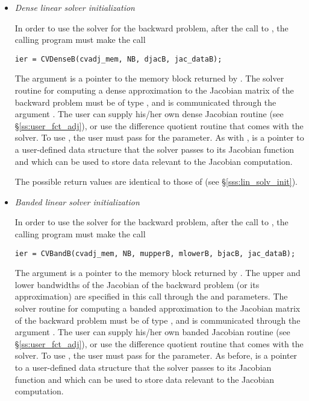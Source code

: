 \begin{itemize}

\item {\em Dense linear solver initialization}

  In order to use the {\cvdense} solver for the backward problem, after the call to 
  , the calling program must make the call
\begin{verbatim}
ier = CVDenseB(cvadj_mem, NB, djacB, jac_dataB);
\end{verbatim}
  The argument  is a pointer to the memory block
  returned by . The {\cvdense} solver routine for computing a
  dense approximation to the Jacobian matrix of the backward problem must be
  of type , and is communicated through the argument
  . The user can supply his/her own dense Jacobian routine
  (see \S\ref{ss:user_fct_adj}), or use the difference quotient routine 
   that comes with the {\cvdense} solver.  To use 
  , the user must pass  for the  parameter.
  As with ,  is a pointer to a user-defined 
  data structure that the {\cvdense} solver passes to its Jacobian function
  and which can be used to store data relevant to the Jacobian computation.
  
  The possible return values  are identical to those of 
  (see \S\ref{sss:lin_solv_init}).

\item {\em Banded linear solver initialization}

  In order to use the {\cvband} solver for the backward problem, after the call to 
  , the calling program must make the call
\begin{verbatim}
ier = CVBandB(cvadj_mem, NB, mupperB, mlowerB, bjacB, jac_dataB);
\end{verbatim}  
  The  argument  is a pointer to the memory block
  returned by . The upper and lower bandwidths of the 
  Jacobian of the backward problem (or its approximation) are specified 
  in this call through the  and  parameters.
  The {\cvband} solver routine for computing a
  banded approximation to the Jacobian matrix of the backward problem must be
  of type , and is communicated through the argument
  . The user can supply his/her own banded Jacobian routine
  (see \S\ref{ss:user_fct_adj}), or use the difference quotient routine 
   that comes with the {\cvband} solver.  To use 
  , the user must pass  for the  parameter.
  As before,  is a pointer to a user-defined 
  data structure that the {\cvband} solver passes to its Jacobian function
  and which can be used to store data relevant to the Jacobian computation.


\end{itemize}
